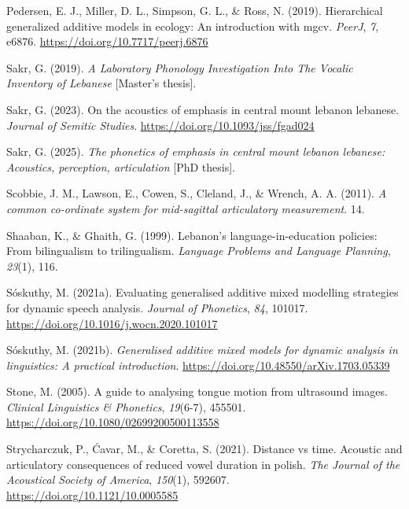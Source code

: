 \documentclass[
  man,
  longtable,
  nolmodern,
  notxfonts,
  notimes,
  colorlinks=true,linkcolor=blue,citecolor=blue,urlcolor=blue]{apa7}
\newlength{\cslhangindent}
\newenvironment{CSLReferences}[2] %
 {\begin{list}{}{%
  \setlength{\itemindent}{0pt}
  \setlength{\leftmargin}{0pt}
  \setlength{\parsep}{0pt}
  \ifodd #1
   \setlength{\leftmargin}{\cslhangindent}
   \setlength{\itemindent}{-1\cslhangindent}
  \fi
  \setlength{\itemsep}{#2\baselineskip}}}
 {\end{list}}
\begin{document}
\begin{CSLReferences}{1}{0}
Pedersen, E. J., Miller, D. L., Simpson, G. L., \& Ross, N. (2019).
Hierarchical generalized additive models in ecology: An introduction
with mgcv. \emph{PeerJ}, \emph{7}, e6876.
\url{https://doi.org/10.7717/peerj.6876}

Sakr, G. (2019). \emph{A Laboratory Phonology Investigation Into The
Vocalic Inventory of Lebanese} {[}Master's thesis{]}.

Sakr, G. (2023). On the acoustics of emphasis in central mount lebanon
lebanese. \emph{Journal of Semitic Studies}.
\url{https://doi.org/10.1093/jss/fgad024}

Sakr, G. (2025). \emph{The phonetics of emphasis in central mount
lebanon lebanese: Acoustics, perception, articulation} {[}PhD thesis{]}.

Scobbie, J. M., Lawson, E., Cowen, S., Cleland, J., \& Wrench, A. A.
(2011). \emph{A common co-ordinate system for mid-sagittal articulatory
measurement}. 14.

Shaaban, K., \& Ghaith, G. (1999). Lebanon's language-in-education
policies: From bilingualism to trilingualism. \emph{Language Problems
and Language Planning}, \emph{23}(1), 116.

Sóskuthy, M. (2021a). Evaluating generalised additive mixed modelling
strategies for dynamic speech analysis. \emph{Journal of Phonetics},
\emph{84}, 101017. \url{https://doi.org/10.1016/j.wocn.2020.101017}

Sóskuthy, M. (2021b). \emph{Generalised additive mixed models for
dynamic analysis in linguistics: A practical introduction}.
\url{https://doi.org/10.48550/arXiv.1703.05339}

Stone, M. (2005). A guide to analysing tongue motion from ultrasound
images. \emph{Clinical Linguistics \& Phonetics}, \emph{19}(6-7),
455501. \url{https://doi.org/10.1080/02699200500113558}

Strycharczuk, P., Ćavar, M., \& Coretta, S. (2021). Distance vs time.
Acoustic and articulatory consequences of reduced vowel duration in
polish. \emph{The Journal of the Acoustical Society of America},
\emph{150}(1), 592607. \url{https://doi.org/10.1121/10.0005585}


\end{CSLReferences}
\end{document}
